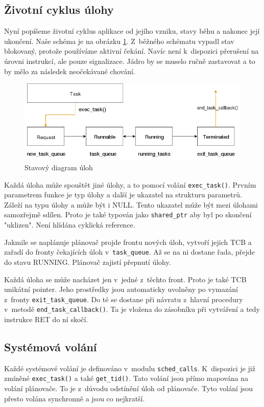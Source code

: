 \documentclass[a4paper,12pt]{article}
\begin{document}
\subsection{Životní cyklus úlohy}
Nyní popíšeme životní cyklus aplikace od jejího vzniku, stavy běhu a nakonec její
ukončení. Naše schéma je na obrázku \ref{fig:state_diagram}. Z~běžného schématu
vypadl stav blokovaný, protože používáme aktivní čekání. Navíc není k~dispozici
přerušení na úrovni instrukcí, ale pouze signalizace. Jádro by se muselo ručně zastavovat a
to by mělo za následek neočekávané chování.

\begin{figure}
\centering
\includegraphics[width=\textwidth]{obrazky/state_diagram.png}
\caption{Stavový diagram úloh}
\label{fig:state_diagram}
\end{figure}

Každá úloha může spouštět jiné úlohy, a to pomocí volání \verb+exec_task()+. Prvním
parametrem funkce je typ úlohy a další je ukazatel na strukturu parametrů. Záleží na typu úlohy a
může být i NULL. Tento ukazatel může být mezi úlohami samozřejmě sdílen. Proto je také
typován jako \verb+shared_ptr+ aby byl po skončení "uklizen". Není hlídána cyklická
reference.

Jakmile se naplánuje plánovač projde frontu nových úloh, vytvoří jejich TCB a zařadí
do fronty čekajících úloh v~\verb+task_queue+.
Až se na ni dostane řada, přejde do stavu RUNNING. Plánovač zajistí přepnutí úlohy.

Každá úloha se může nacházet jen v~jedné z~těchto front. Proto je také TCB unikátní pointer.
Jeho prostředky jsou automaticky uvolněny po vymazání z~fronty
\verb+exit_task_queue+. Do té se dostane při návratu z~hlavní procedury v~metodě
\verb+end_task_callback()+. Ta je vložena do zásobníku při vytváření a tedy instrukce
RET do ní skočí.

\subsection{Systémová volání}
Každé systémové volání je definováno v~modulu \verb+sched_calls+. K~dispozici
je již zmíněné \verb+exec_task()+ a také \verb+get_tid()+. Tato volání jsou přímo
mapována na volání plánovače. To je z~důvodu odstínění úloh od plánovače. Tyto
volání jsou přesto volána synchronně a jsou co nejkratší.
\end{document}
